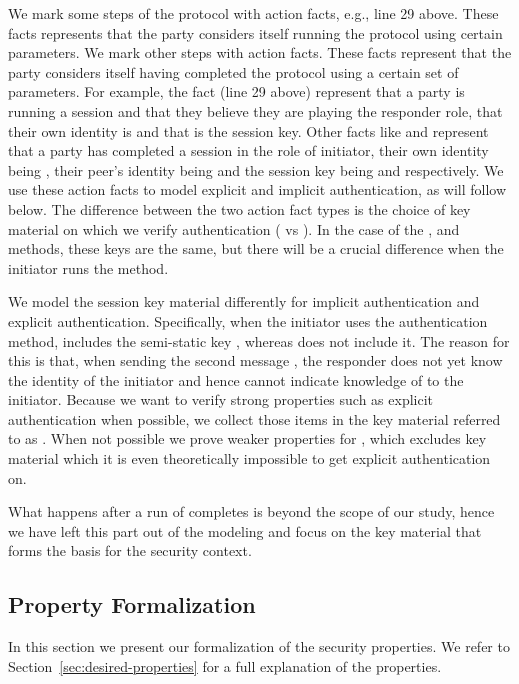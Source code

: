 {We mark some steps of the protocol with  action facts, e.g., line 29
above.
%
These facts represents that the party considers itself running the
protocol using certain parameters.
%
We mark other steps with  action facts.
%
These facts represent that the party considers itself having
completed the protocol using a certain set of parameters.
%
For example, the fact  (line 29 above)
represent that a party is running a session and that they believe
they are playing the responder role, that their own identity is 
and that  is the session key.
%
Other facts like 
%
and  represent that a party has completed
a session in the role of initiator, their own identity being , their
peer's identity being  and the session key being  and
 respectively.
%
We use these action facts to model explicit and implicit authentication, as will
follow below.
%
The difference between the two  action fact types is the choice of
key material on which we verify authentication ( vs ).
%
In the case of the \mSigSig{}, \mSigStat{} and \mPskPsk{} methods, these keys
are the same, but there will be a crucial difference when the initiator runs
the \mStat{} method.
%

We model the session key material differently for implicit authentication and
explicit authentication.
%
Specifically, when the initiator uses the \mStat{} authentication method,
 includes the semi-static key \mGiy{}, whereas  does not
include it.
%
The reason for this is that, when sending the second message \mMsgtwo{}, the
responder does not yet know the identity of the initiator and hence cannot
indicate knowledge of \mGiy{} to the initiator.
%
Because we want to verify strong properties such as explicit authentication
when possible, we collect those items in the key material referred to as
.
%
When not possible we prove weaker properties for , which excludes
key material which it is even theoretically impossible to get explicit
authentication on.
%

What happens after a run of \mEdhoc{} completes is beyond the scope of our study, hence
we have left this part out of the modeling and focus on the key material
that forms the basis for the \mOscore{} security context.
%

\subsection{Property Formalization}
\label{sec:propertyFormalization}
In this section we present our formalization of the security properties. %
%
We refer to Section~\ref{sec:desired-properties} for a full explanation of the
properties.
\\

}
